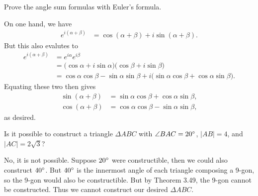 \documentclass[twoside,10pt]{article}
\begin{document}
\newpage

\begin{exer}[3.40]
Prove the angle sum formulas with Euler's formula.
\end{exer}

On one hand, we have
\begin{align*}
	e^{i(\alpha+\beta)} &= \cos(\alpha+\beta) + i \sin (\alpha+\beta).
\end{align*}
But this also evalutes to
\begin{align*}
	e^{i(\alpha+\beta)} &= e^{i\alpha}e^{i\beta} \\
			    &= \big( \cos\alpha+i\sin\alpha \big) \big( \cos\beta + i\sin\beta \big) \\
			    &= \cos \alpha\cos\beta - \sin\alpha\sin\beta + i\big( \sin \alpha\cos\beta+\cos\alpha\sin\beta \big).
\end{align*}
Equating these two then gives
\begin{align*}
	\sin(\alpha+\beta) &= \sin \alpha\cos\beta+\cos\alpha\sin\beta, \\
	\cos(\alpha+\beta) &= \cos \alpha\cos\beta - \sin\alpha\sin\beta,
\end{align*}
as desired.

\newpage

\begin{exer}[3.55]
	Is it possible to construct a triangle $\Delta ABC$ with $\angle BAC = 20^\circ$, $|AB|=4$, and $|AC| = 2 \sqrt{3} $?
\end{exer}

No, it is not possible. Suppose $20^\circ$ were constructible, then we could also construct $40^\circ$. But $40^\circ$ is the innermost angle of each triangle composing a 9-gon, so the 9-gon would also be constructible. But by Theorem 3.49, the 9-gon cannot be constructed. Thus we cannot construct our desired $\Delta ABC$.

\newpage
\end{document}
